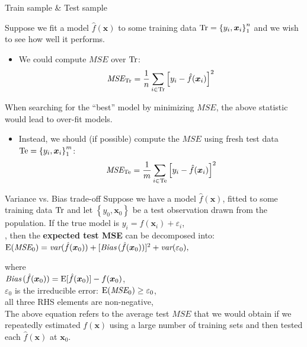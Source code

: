 \documentclass{beamer}
\begin{document}
\begin{frame}{Train sample \& Test sample}

Suppose we fit a model $\hat{f}(\bm{x})$ to some training data $\textnormal{Tr}=\left\lbrace y_i, \bm{x}_i \right\rbrace _1 ^n$ and we wish to see how well it performs.

\begin{itemize}
\item We could compute $\textit{MSE}$ over $\textnormal{Tr}$:
$$ \textit{MSE}_{\textnormal{Tr}} = \frac{1}{n}
   \sum_{i \in \textnormal{Tr}}
   \left[y_i - \hat{f}(\bm{x}_i) \right]^2 $$
\end{itemize}

When searching for the ``best'' model by minimizing $ \textit{MSE}$, the above statistic would lead to over-fit models.
\vspace{0.3cm}
\begin{itemize}
\item Instead, we should (if possible) compute the $ \textit{MSE}$ using fresh test
data $\textnormal{Te}=\left\lbrace y_i, \bm{x}_i \right\rbrace _1 ^m$:
$$ \textit{MSE}_{\textnormal{Te}} = \frac{1}{m}
    \sum_{i \in \textnormal{Te}}
   \left[y_i - \hat{f}(\bm{x}_i) \right]^2 $$
\end{itemize}
\end{frame}
\begin{frame}{Variance vs. Bias trade-off}
Suppose we have a model $\hat{f}(\bm{x})$, fitted to some training data $\textnormal{Tr}$ and let $\left\lbrace y_0, \bm{x}_0 \right\rbrace$ be a test observation drawn from the population. If the true model is $y_i = f(\bm{x}_i) + \varepsilon_i$, \\[with $f(\bm{x}_i)= \textnormal{E}(y_i | \bm{x}_i )$],
then the \textbf{expected test MSE} can be decomposed into:\\

\medskip
$\textnormal{E}(\textit{MSE}_0)
   = \textit{var}(\hat{f}(\bm{x}_0))
   + [\textit{Bias\,}(\hat{f}(\bm{x}_0))]^2
   + \textit{var}(\varepsilon_0),$

where\\
\smallskip
$\textit{Bias\,}(\hat{f}(\bm{x}_0)) 
       = \textnormal{E}[\hat{f}(\bm{x}_0)]
       - f(\bm{x}_0)$,\\
$\varepsilon_0$ is the irreducible error: $\textnormal{E}(\textit{MSE}_0) \geq \varepsilon_0$,\\ 
all three RHS elements are non-negative,\\
\smallskip
The above equation refers to the average test $\textit{MSE}$ that we would obtain if we repeatedly estimated $f(\bm{x})$ using a large number of training sets and then tested each $\hat{f}(\bm{x})$ at $\bm{x}_0$.
\end{frame}
\end{document}
